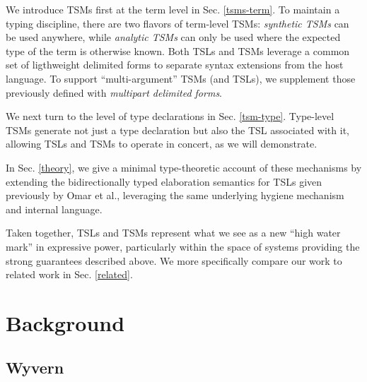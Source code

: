 \documentclass{sig-alternate}
\begin{document}
We introduce TSMs first at the term level in Sec. \ref{tsms-term}.  To maintain a typing discipline, there are two flavors of term-level TSMs: \emph{synthetic TSMs} can be used anywhere, while \emph{analytic TSMs} can only be used where the expected type of the term is otherwise known. Both TSLs and TSMs leverage a common set of  ligthweight delimited forms to separate syntax extensions from the host language. To support ``multi-argument'' TSMs (and TSLs), we supplement those previously defined with \emph{multipart delimited forms}. 

We next turn to the level of type declarations  in Sec. \ref{tsm-type}. Type-level TSMs generate not just a type declaration but also the TSL associated with it, allowing TSLs and TSMs to operate in concert, as we will demonstrate. 

In Sec. \ref{theory}, we give a minimal type-theoretic account of these mechanisms by extending the bidirectionally typed elaboration semantics for TSLs given previously by Omar et al., leveraging the same underlying hygiene mechanism and internal language.%

Taken together, TSLs and TSMs represent what we see as a new ``high water mark'' in expressive power, particularly within the space of systems providing the strong guarantees described above. We more specifically compare our work to related work in Sec. \ref{related}. 

\section{Background}\label{background}
\subsection{Wyvern}
\end{document}

